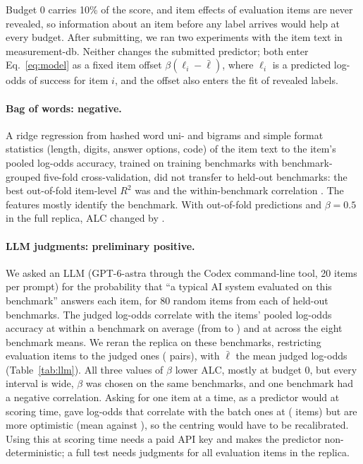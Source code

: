 \documentclass{article}
\begin{document}
Budget 0 carries 10\% of the score, and item effects of evaluation items are never revealed, so information about an item before any label arrives would help at every budget. After submitting, we ran two experiments with the item text in measurement-db. Neither changes the submitted predictor; both enter Eq.~\ref{eq:model} as a fixed item offset $\beta(\ell_i - \bar\ell)$, where $\ell_i$ is a predicted log-odds of success for item $i$, and the offset also enters the fit of revealed labels.

\paragraph{Bag of words: negative.} A ridge regression from hashed word uni- and bigrams and simple format statistics (length, digits, answer options, code) of the item text to the item's pooled log-odds accuracy, trained on \TextBench{} training benchmarks with benchmark-grouped five-fold cross-validation, did not transfer to held-out benchmarks: the best out-of-fold item-level $R^2$ was \TextItemRtwo{} and the within-benchmark correlation \TextWithin{}. The features mostly identify the benchmark. With out-of-fold predictions and $\beta=0.5$ in the full replica, ALC changed by \TextAlcDiff{}.

\paragraph{LLM judgments: preliminary positive.} We asked an LLM (GPT-6-astra through the Codex command-line tool, 20 items per prompt) for the probability that ``a typical AI system evaluated on this benchmark'' answers each item, for 80 random items from each of \LlmBench{} held-out benchmarks. The judged log-odds correlate with the items' pooled log-odds accuracy at \LlmWithinCorr{} within a benchmark on average (from \LlmWithinMin{} to \LlmWithinMax{}) and at \LlmBenchCorr{} across the eight benchmark means. We reran the replica on these benchmarks, restricting evaluation items to the judged ones (\LlmPairs{} pairs), with $\bar\ell$ the mean judged log-odds (Table~\ref{tab:llm}). All three values of $\beta$ lower ALC, mostly at budget 0, but every interval is wide, $\beta$ was chosen on the same benchmarks, and one benchmark had a negative correlation. Asking for one item at a time, as a predictor would at scoring time, gave log-odds that correlate with the batch ones at \SingleCorrBatch{} (\SingleN{} items) but are more optimistic (mean \SingleMean{} against \SingleBatchMean{}), so the centring would have to be recalibrated. Using this at scoring time needs a paid API key and makes the predictor non-deterministic; a full test needs judgments for all evaluation items in the replica.
\end{document}
